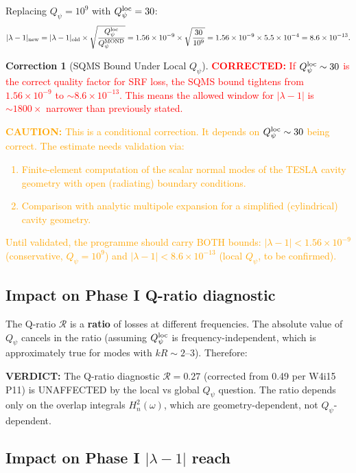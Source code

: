 \documentclass[11pt]{article}
\newcommand{\lam}{\lambda}
\newcommand{\ee}[1]{\times 10^{#1}}
\newcommand{\lbone}{|\lam - 1|}
\newcommand{\corrected}[1]{\textcolor{red}{\textbf{CORRECTED:} #1}}
\newcommand{\caution}[1]{\textcolor{orange}{\textbf{CAUTION:} #1}}
\newcommand{\verdict}[1]{\textcolor{green!50!black}{\textbf{VERDICT:} #1}}
\theoremstyle{definition}
\newtheorem{correction}[theorem]{Correction}
\theoremstyle{remark}
\begin{document}
Replacing $Q_\psi = 10^9$ with $Q_\psi^{\rm loc} = 30$:
\begin{equation}
\lbone_{\rm new} = \lbone_{\rm old} \times
\sqrt{\frac{Q_\psi^{\rm loc}}{Q_\psi^{\rm MOND}}}
= 1.56\ee{-9} \times \sqrt{\frac{30}{10^9}}
= 1.56\ee{-9} \times 5.5\ee{-4} = 8.6\ee{-13}.
\label{eq:bound_local}
\end{equation}

\begin{correction}[SQMS Bound Under Local $Q_\psi$]
\label{corr:sqms}
\corrected{If $Q_\psi^{\rm loc} \sim 30$ is the correct quality factor
for SRF loss, the SQMS bound tightens from $1.56\ee{-9}$ to
$\sim 8.6\ee{-13}$. This means the allowed window for $|\lambda-1|$
is $\sim 1800\times$ narrower than previously stated.}

\caution{This is a conditional correction. It depends on $Q_\psi^{\rm loc}
\sim 30$ being correct. The estimate needs validation via:
\begin{enumerate}[nosep]
\item Finite-element computation of the scalar normal modes of the
  TESLA cavity geometry with open (radiating) boundary conditions.
\item Comparison with analytic multipole expansion for a simplified
  (cylindrical) cavity geometry.
\end{enumerate}
Until validated, the programme should carry BOTH bounds:
$\lbone < 1.56\ee{-9}$ (conservative, $Q_\psi = 10^9$) and
$\lbone < 8.6\ee{-13}$ (local $Q_\psi$, to be confirmed).}
\end{correction}


\subsection{Impact on Phase I Q-ratio diagnostic}

The Q-ratio $\mathcal{R}$ is a \textbf{ratio} of losses at different
frequencies. The absolute value of $Q_\psi$ cancels in the ratio
(assuming $Q_\psi^{\rm loc}$ is frequency-independent, which is
approximately true for modes with $kR \sim 2$--3). Therefore:

\verdict{The Q-ratio diagnostic $\mathcal{R} = 0.27$ (corrected from
0.49 per W4i15 P11) is UNAFFECTED by the local vs global $Q_\psi$
question. The ratio depends only on the overlap integrals
$H_n^2(\omega)$, which are geometry-dependent, not $Q_\psi$-dependent.}


\subsection{Impact on Phase I $|\lambda-1|$ reach}
\end{document}
